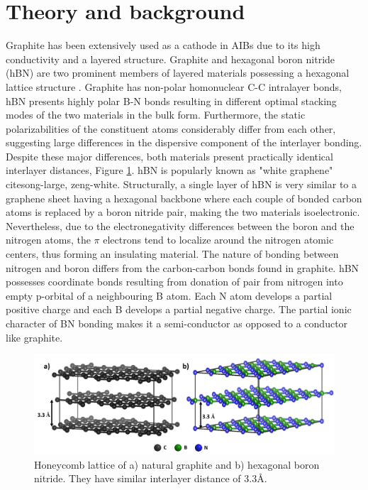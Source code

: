 \section{Theory and background}
Graphite has been extensively used as a cathode in AIBs due to its high conductivity and a layered structure. Graphite and hexagonal boron nitride (hBN) are two prominent members of layered materials possessing a hexagonal lattice structure \cite{hod_graphite_2012}. Graphite has non-polar homonuclear C-C intralayer bonds, hBN presents highly polar B-N bonds resulting in different optimal stacking modes of the two materials in the bulk form. Furthermore, the static polarizabilities of the constituent atoms considerably differ from each other, suggesting large differences in the dispersive component of the interlayer bonding. Despite these major differences, both materials present practically identical interlayer distances, Figure \ref{Figures/BOhBN:grpBNcomp}. hBN is popularly known as "white graphene" cite{song-large, zeng-white}. Structurally, a single layer of hBN is very similar to a graphene sheet having a hexagonal backbone where each couple of bonded carbon atoms is replaced by a boron nitride pair, making the two materials isoelectronic. Nevertheless, due to the electronegativity differences between the boron and the nitrogen atoms, the $\pi$ electrons tend to localize around the nitrogen atomic centers, thus forming an insulating material. The nature of bonding between nitrogen and boron differs from the carbon-carbon bonds found in graphite. hBN possesses coordinate bonds resulting from donation of  pair from nitrogen into empty p-orbital of a neighbouring B atom. Each N atom develops a partial positive charge and each B develops a partial negative charge. The partial ionic character of BN bonding makes it a semi-conductor as opposed to a conductor like graphite. 
\begin{figure}[tbh!]
\centering
\includegraphics[width=\textwidth]{Figures/BOhBN/grpBNcomp}
\caption{Honeycomb lattice of a) natural graphite and b) hexagonal boron nitride. They have similar interlayer distance of 3.3\AA.}
\label{Figures/BOhBN:grpBNcomp}
\end{figure}
